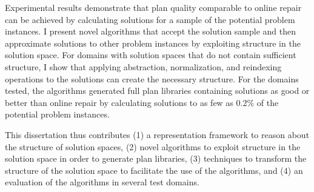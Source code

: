 Experimental results demonstrate that plan quality comparable to online repair can be achieved by calculating solutions for a sample of the potential problem instances.  I present novel algorithms that accept the solution sample and then approximate solutions to other problem instances by exploiting structure in the solution space.  For domains with solution spaces that do not contain sufficient structure, I show that applying abstraction, normalization, and reindexing operations to the solutions can create the necessary structure.  For the domains tested, the algorithms generated full plan libraries containing solutions as good or better than online repair by calculating solutions to as few as 0.2\% of the potential problem instances.

This dissertation thus contributes (1) a representation framework to reason about the structure of solution spaces, (2) novel algorithms to exploit structure in the solution space in order to generate plan libraries, (3) techniques to transform the structure of the solution space to facilitate the use of the algorithms, and (4) an evaluation of the algorithms in several test domains.






\par\vfil

